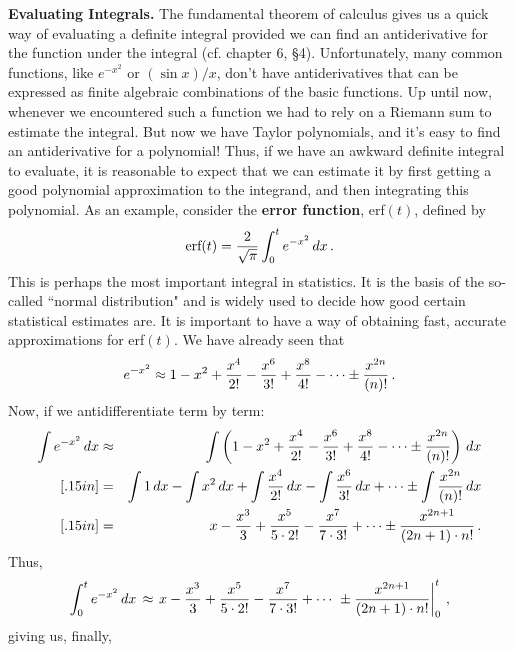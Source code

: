 {{{{{\bf Evaluating Integrals.} The fundamental theorem of
calculus gives us a quick way of evaluating a definite integral provided
we can find an antiderivative for the function under the integral (cf.
chapter 6, \S4).  Unfortunately, many common functions, like $e^{-x^2}$
or $(\sin{x} )/x$, don't have antiderivatives that can be expressed as
finite algebraic combinations of the basic functions.  Up until now,
whenever we encountered such a function we had to rely on a Riemann sum
to estimate the integral.  But now we have Taylor polynomials, and it's
easy to find an antiderivative for a polynomial!  Thus, if we have an
awkward definite integral to evaluate, it is reasonable to expect that
we can estimate it by first getting a good polynomial approximation to
the integrand, and then integrating this polynomial.  As an example,
consider the {\bf error function}, erf$(t)$,
 defined by
        \[
\mbox{erf$(t)$} = {2 \over \sqrt{\pi}}\int_0^t e^{-x^2} \, dx\, .
\] 
This is perhaps the most important integral in statistics.
        It is the basis of the so-called ``normal distribution" and is
        widely used to decide how good certain statistical estimates
        are.  It is important to have a way of obtaining fast, accurate
        approximations for erf$(t)$.  We have already seen that
        \[
e^{-x^2} \approx 1 - x^2 + {x^4 \over 2!} - 
                {x^6 \over 3!} + {x^8 \over 4!} - \cdots \pm {x^{2n} \over (n)!} \, .
\]
Now, if we antidifferentiate term by term:
        \begin{eqnarray*}
        \int e^{-x^2}\, dx &\approx& \int \left( 1 - x^2 + 
                {x^4 \over 2!} - {x^6 \over 3!} + 
                {x^8 \over 4!} - \cdots \pm {x^{2n} \over (n)!}\right) \, dx \\ [.15in]
        &=& \int 1 \, dx - \int x^2 \, dx + 
                \int {x^4 \over 2!} \, dx - \int {x^6 \over 3!} \, dx 
                + \cdots  \pm \int {x^{2n} \over (n)!} \, dx\\ [.15in]
        &=& x - {x^3 \over 3} + {x^5 \over 5 \cdot 2!} -
                {x^7 \over 7 \cdot 3!} + \cdots \pm {x^{2n+1} \over (2n+1)\cdot n!}\, .
        \end{eqnarray*}
Thus,
        \[
\int_0^t e^{-x^2} \, dx\, \approx \left.
                x - {x^3 \over 3} + {x^5 \over 5 \cdot 2!} -
                {x^7 \over 7 \cdot 3!} + \cdots\ \pm {x^{2n+1} \over
                  (2n+1) \cdot n!}\right|_0^t \, ,
\]
giving us, finally, 
}}}}
